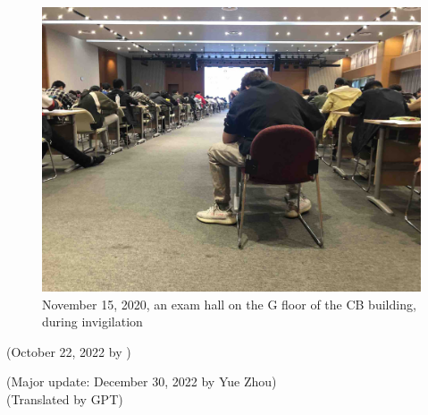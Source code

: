 \begin{figure}[H]
    \centering
    \includegraphics[width=0.9\columnwidth]{author-folder/Kai.Wu/invigilation.jpg}
    \caption{November 15, 2020, an exam hall on the G floor of the CB building, during invigilation}
\end{figure}

\begin{flushright}
    (October 22, 2022 by \Wu)

    (Major update: December 30, 2022 by Yue Zhou) \\
    (Translated by GPT)
\end{flushright}




% 
